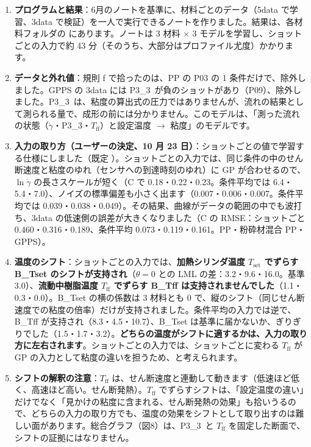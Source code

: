 \documentclass[paper=a4paper,fontsize=10.5pt,line_length=44zw,number_of_lines=38]{jlreq}
\newcommand{\file}[1]{\texttt{\detokenize{#1}}}
\newcommand{\gd}{\dot{\gamma}}
\newcommand{\Tff}{T_{\mathrm{ff}}}
\newcommand{\Tset}{T_{\mathrm{set}}}
\newcommand{\PIII}{P3\_3}
\begin{document}
\begin{enumerate}[itemsep=0.8ex,topsep=0.6ex]
\item \textbf{プログラムと結果}：6月のノートを基準に、材料ごとのデータ（5data で学習、3data で検証）を一人で実行できるノートを作りました。結果は、各材料フォルダの \file{<材料フォルダ>_学習結果/<入力の取り方>/} にあります。ノートは 3 材料 $\times$ 3 モデルを学習し、ショットごとの入力で約 43 分（そのうち、大部分はプロファイル尤度）かかります。
\item \textbf{データと外れ値}：規則 f で拾ったのは、PP の P03 の 1 条件だけで、除外しました。GPPS の 3data には \PIII\ が負のショットがあり（P09）、除外しました。\PIII\ は、粘度の算出式の圧力ではありませんが、流れの結果として測られる量で、成形の前には分かりません。このモデルは、「測った流れの状態（$\gd$・\PIII・$\Tff$）と設定温度 $\rightarrow$ 粘度」のモデルです。
\item \textbf{入力の取り方（ユーザーの決定、10 月 23 日）}：ショットごとの値で学習する仕様にしました（既定 \file{"shot"}）。ショットごとの入力では、同じ条件の中のせん断速度と粘度のゆれ（センサへの到達時刻のゆれ）に GP が合わせるので、$\ln\gd$ の長さスケールが短く（C で 0.18・0.22・0.23。条件平均では 6.4・5.4・7.0）、ノイズの標準偏差も小さく出ます（0.007・0.006・0.007。条件平均では 0.039・0.038・0.049）。その結果、曲線がデータの範囲の中でも波打ち、3data の低速側の誤差が大きくなりました（C の RMSE：ショットごと 0.460・0.316・0.189、条件平均 0.073・0.119・0.161。PP・粉砕材混合 PP・GPPS）。
\item \textbf{温度のシフト}：ショットごとの入力では、\textbf{加熱シリンダ温度 $\Tset$ でずらす B\_Tset のシフトが支持され}（$\theta=0$ との LML の差：3.2・9.6・16.0。基準 3.0）、\textbf{流動中樹脂温度 $\Tff$ でずらす B\_Tff は支持されませんでした}（1.1・0.3・0.0）。B\_Tset の横の係数は 3 材料とも 0 で、縦のシフト（同じせん断速度での粘度の倍率）だけが支持されました。条件平均の入力では逆で、B\_Tff が支持され（8.3・4.5・10.7）、B\_Tset は基準に届かないか、ぎりぎりでした（1.5・1.7・3.2）。\textbf{どちらの温度がシフトに適するかは、入力の取り方に左右されます}。ショットごとの入力では、ショットごとに変わる $\Tff$ が GP の入力として粘度の違いを担うため、と考えられます。
\item \textbf{シフトの解釈の注意}：$\Tff$ は、せん断速度と連動して動きます（低速ほど低く、高速ほど高い。せん断発熱）。$\Tff$ でずらすシフトは、「設定温度の違い」だけでなく「見かけの粘度に含まれる、せん断発熱の効果」も拾いうるので、どちらの入力の取り方でも、温度の効果をシフトとして取り出すのは難しい面があります。総合グラフ（図8）は、\PIII\ と $\Tff$ を固定した断面で、シフトの証拠にはなりません。

\end{enumerate}
\end{document}
